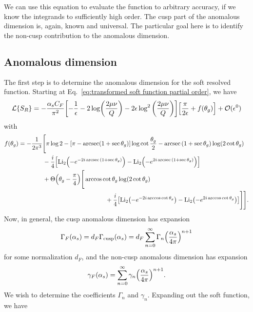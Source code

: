 \documentclass[11pt,twoside,reqno]{amsart}
\theoremstyle{plain}
\theoremstyle{remark}
\theoremstyle{definition}
\theoremstyle{remark}
\theoremstyle{definition}
\theoremstyle{definition}
\newcommand{\cL}{\mathcal{L}}
\newcommand{\cO}{\mathcal{O}}
\newcommand{\Li}{\mathrm{Li}}
\newcommand{\cusp}{\mathrm{cusp}}
\begin{document}
	We can use this equation to evaluate the function to arbitrary accuracy, if we know the integrands to sufficiently high order. The cusp part of the anomalous dimension is, again, known and universal. The particular goal here is to identify the non-cusp contribution to the anomalous dimension.

\subsection{Anomalous dimension}
	The first step is to determine the anomalous dimension for the soft resolved function. Starting at Eq.~\ref{eq:transformed soft function partial order}, we have
	\begin{equation}
		\cL\qty{S_R} = -\frac{\alpha_s C_F}{\pi^2}\qty[-\frac{1}{\epsilon} - 2\log(\frac{2\mu\nu}{Q}) - 2\epsilon\log^2\qty(\frac{2\mu\nu}{Q})]\qty[\frac{\pi}{2\epsilon} + f(\theta_g)] + \cO(\epsilon^0)
	\end{equation}
	with
	\begin{equation}\label{eq:non-cusp f function}
	\begin{aligned}
		f(\theta_g) &= -\frac{1}{2\pi^3}\Bigg[\pi \log 2 - \qty[\pi - \arcsec(1 + \sec\theta_g)]\log\cot\frac{\theta_g}{2} - \arcsec\qty(1 + \sec\theta_g) \log(2\cot\theta_g) \\
			&\qquad\qquad - \frac{i}{4}\qty[\Li_2\qty(-e^{-2i\arcsec\qty(1 + \sec\theta_g)}) - \Li_2\qty(-e^{2i\arcsec\qty(1 + \sec\theta_g)})] \\
			&\qquad\qquad+ \Theta\qty(\theta_g - \frac{\pi}{4})\Bigg[ \arccos\cot\theta_g \log(2\cot\theta_g) \\
			&\hspace{5cm}+ \frac{i}{4}\qty[\Li_2\qty(-e^{-2i\arccos\cot\theta_g}) - \Li_2\qty(-e^{2i\arccos\cot\theta_g})] \Bigg]\Bigg].
	\end{aligned}
	\end{equation}
	Now, in general, the cusp anomalous dimension has expansion \cite{frye_factorization_2016}
	\begin{equation}
		\Gamma_{F}(\alpha_s) = d_F\Gamma_\cusp(\alpha_s) = d_F\sum_{n = 0}^\infty \Gamma_n \qty(\frac{\alpha_s}{4\pi})^{n+1}
	\end{equation}
	for some normalization $d_F$, and the non-cusp anomalous dimension has expansion
	\begin{equation}
		\gamma_F(\alpha_s) = \sum_{n = 0}^\infty \gamma_n \qty(\frac{\alpha_s}{4\pi})^{n+1}.
	\end{equation}
	We wish to determine the coefficients $\Gamma_n$ and $\gamma_n$. Expanding out the soft function, we have
\end{document}

